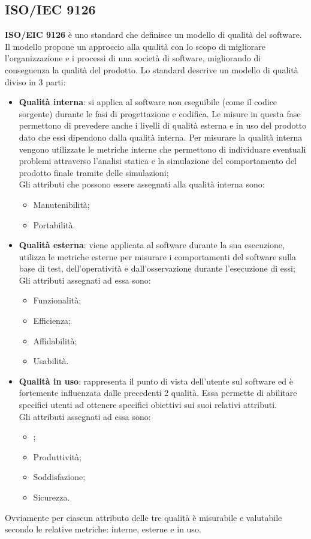 \documentclass[../piano-di-qualifica.tex]{subfiles}
\begin{document}
\subsection{ISO/IEC 9126}%
\label{sec:iso/iec_9126}
\textbf{ISO/EIC 9126} è uno standard che definisce un modello di qualità del software. Il modello propone un approccio alla qualità con lo scopo di migliorare l'organizzazione e i processi di una società di software, migliorando di conseguenza la qualità del prodotto.
Lo standard descrive un modello di qualità diviso in 3 parti:
\begin{itemize}
    \item \textbf{Qualità interna}: si applica al software non eseguibile (come il codice sorgente) durante le fasi di progettazione e codifica.
    Le misure in questa fase permettono di prevedere anche i livelli di qualità esterna e in uso del prodotto dato che essi dipendono dalla qualità interna.
    Per misurare la qualità interna vengono utilizzate le metriche interne che permettono di individuare eventuali problemi attraverso l'analisi statica e la simulazione del comportamento del prodotto finale tramite delle simulazioni;
    \\Gli attributi che possono essere assegnati alla qualità interna sono:
    \begin{itemize}
        \item Manutenibilità;
        \item Portabilità.
    \end{itemize}
    \item \textbf{Qualità esterna}: viene applicata al software durante la sua esecuzione, utilizza le metriche esterne per misurare i comportamenti del software sulla base di test, dell'operatività e dall'osservazione durante l'esecuzione di essi;
    \\Gli attributi assegnati ad essa sono:
    \begin{itemize}
        \item Funzionalità;
        \item Efficienza;
        \item Affidabilità;
        \item Usabilità.
    \end{itemize}
    \item \textbf{Qualità in uso}: rappresenta il punto di vista dell'utente sul software ed è fortemente influenzata dalle precedenti 2 qualità. Essa permette di abilitare specifici utenti ad ottenere specifici obiettivi sui suoi relativi attributi.
    \\Gli attributi assegnati ad essa sono:
    \begin{itemize}
        \item {};
        \item Produttività;
        \item Soddisfazione;
        \item Sicurezza.
    \end{itemize}
\end{itemize}
Ovviamente per ciascun attributo delle tre qualità è misurabile e valutabile secondo le relative metriche: interne, esterne e in uso.
\end{document}
